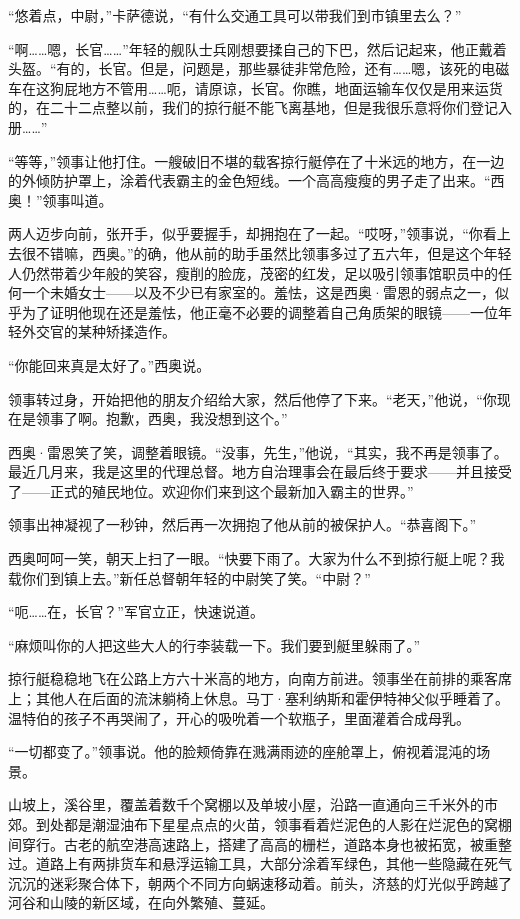 \documentclass[AutoFakeBold=true]{book}
\begin{document}
``悠着点，中尉，''卡萨德说，``有什么交通工具可以带我们到市镇里去么？''

``啊……嗯，长官……''年轻的舰队士兵刚想要揉自己的下巴，然后记起来，他正戴着头盔。``有的，长官。但是，问题是，那些暴徒非常危险，还有……嗯，该死的电磁车在这狗屁地方不管用……呃，请原谅，长官。你瞧，地面运输车仅仅是用来运货的，在二十二点整以前，我们的掠行艇不能飞离基地，但是我很乐意将你们登记入册……''

``等等，''领事让他打住。一艘破旧不堪的载客掠行艇停在了十米远的地方，在一边的外倾防护罩上，涂着代表霸主的金色短线。一个高高瘦瘦的男子走了出来。``西奥！''领事叫道。

两人迈步向前，张开手，似乎要握手，却拥抱在了一起。``哎呀，''领事说，``你看上去很不错嘛，西奥。''的确，他从前的助手虽然比领事多过了五六年，但是这个年轻人仍然带着少年般的笑容，瘦削的脸庞，茂密的红发，足以吸引领事馆职员中的任何一个未婚女士——以及不少已有家室的。羞怯，这是西奥·雷恩的弱点之一，似乎为了证明他现在还是羞怯，他正毫不必要的调整着自己角质架的眼镜——一位年轻外交官的某种矫揉造作。

``你能回来真是太好了。''西奥说。

领事转过身，开始把他的朋友介绍给大家，然后他停了下来。``老天，''他说，``你现在是领事了啊。抱歉，西奥，我没想到这个。''

西奥·雷恩笑了笑，调整着眼镜。``没事，先生，''他说，``其实，我不再是领事了。最近几月来，我是这里的代理总督。地方自治理事会在最后终于要求——并且接受了——正式的殖民地位。欢迎你们来到这个最新加入霸主的世界。''

领事出神凝视了一秒钟，然后再一次拥抱了他从前的被保护人。``恭喜阁下。''

西奥呵呵一笑，朝天上扫了一眼。``快要下雨了。大家为什么不到掠行艇上呢？我载你们到镇上去。''新任总督朝年轻的中尉笑了笑。``中尉？''

``呃……在，长官？''军官立正，快速说道。

``麻烦叫你的人把这些大人的行李装载一下。我们要到艇里躲雨了。''

掠行艇稳稳地飞在公路上方六十米高的地方，向南方前进。领事坐在前排的乘客席上；其他人在后面的流沫躺椅上休息。马丁·塞利纳斯和霍伊特神父似乎睡着了。温特伯的孩子不再哭闹了，开心的吸吮着一个软瓶子，里面灌着合成母乳。

``一切都变了。''领事说。他的脸颊倚靠在溅满雨迹的座舱罩上，俯视着混沌的场景。

山坡上，溪谷里，覆盖着数千个窝棚以及单坡小屋，沿路一直通向三千米外的市郊。到处都是潮湿油布下星星点点的火苗，领事看着烂泥色的人影在烂泥色的窝棚间穿行。古老的航空港高速路上，搭建了高高的栅栏，道路本身也被拓宽，被重整过。道路上有两排货车和悬浮运输工具，大部分涂着军绿色，其他一些隐藏在死气沉沉的迷彩聚合体下，朝两个不同方向蜗速移动着。前头，济慈的灯光似乎跨越了河谷和山陵的新区域，在向外繁殖、蔓延。
\end{document}
